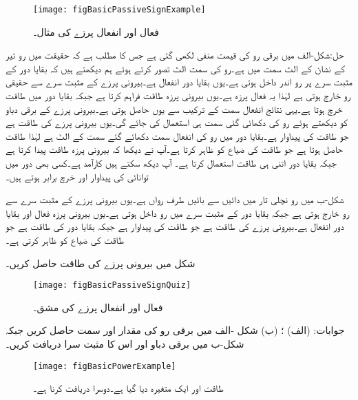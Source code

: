 \begin{figure}
\centering
\texttt{[image: figBasicPassiveSignExample]}
\caption{فعال اور انفعال پرزے کی مثال۔}
\label{شکل_بنیادی_فعال_انفعال_مثال}
\end{figure}

حل:شکل-الف میں برقی رو کی قیمت منفی لکھی گئی ہے جس کا مطلب ہے کہ حقیقت میں رو تیر کے نشان کے الٹ سمت میں ہے۔رو کی سمت الٹ تصور کرتے ہوئے ہم دیکھتے ہیں کہ بقایا دور کے مثبت سرے پر رو اندر داخل ہوتی ہے۔یوں بقایا دور انفعال ہے۔بیرونی پرزے کے مثبت سرے سے حقیقی رو خارج ہوتی ہے لہٰذا یہ فعال پرزہ ہے۔یوں بیرونی پرزہ طاقت فراہم کرتا ہے جبکہ بقایا دور میں طاقت خرچ ہوتا ہے۔یہی نتائج انفعال سمت کے ترکیب سے یوں حاصل ہوتی ہے۔بیرونی پرزے کے برقی دباو کو دیکھتے ہوئے رو کی دکھائی گئی سمت ہی استعمال کی جائے گی۔یوں بیرونی پرزے کی طاقت  ہے جو طاقت کی پیداوار ہے۔بقایا دور میں رو کی انفعال سمت دکھائے گئے سمت کے الٹ ہے لہٰذا طاقت  حاصل ہوتا ہے جو طاقت کی ضیاع کو ظاہر کرتا ہے۔آپ نے دیکھا کہ بیرونی پرزہ  طاقت پیدا کرتا ہے جبکہ بقایا دور اتنی ہی طاقت استعمال کرتا ہے۔ آپ دیکھ سکتے ہیں  کارآمد ہے۔کسی بھی دور میں توانائی کی پیداوار اور خرچ برابر ہوتے ہیں۔

شکل-ب میں رو نچلی تار میں دائیں سے بائیں طرف رواں ہے۔یوں بیرونی پرزے کے مثبت سرے سے رو خارج ہوتی ہے جبکہ بقایا دور کے مثبت سرے میں رو داخل ہوتی ہے۔یوں بیرونی پرزہ فعال اور بقایا دور انفعال ہے۔بیرونی پرزے کی طاقت  ہے جو طاقت کی پیداوار ہے جبکہ بقایا دور کی طاقت  ہے جو طاقت کی ضیاع کو ظاہر کرتی ہے۔

شکل  میں بیرونی پرزے کی طاقت حاصل کریں۔

\begin{figure}
\centering
\texttt{[image: figBasicPassiveSignQuiz]}
\caption{فعال اور انفعال پرزے کی مشق۔}
\label{شکل_بنیادی_فعال_انفعال_مشق}
\end{figure}

جوابات: (الف) ؛ (ب) 
شکل -الف میں برقی رو کی مقدار اور سمت حاصل کریں جبکہ شکل-ب میں برقی دباو اور اس کا مثبت سرا دریافت کریں۔
\begin{figure}
\centering
\texttt{[image: figBasicPowerExample]}
\caption{طاقت اور ایک متغیرہ دیا گیا ہے۔دوسرا دریافت کرنا ہے۔}
\label{شکل_بنیادی_طاقت_مثال}
\end{figure}

